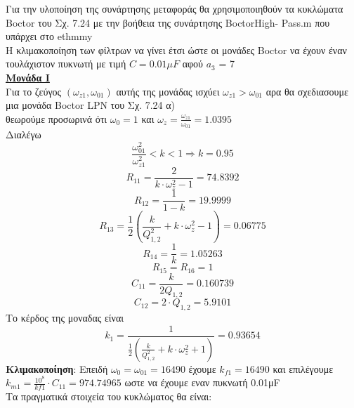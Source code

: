 \documentclass{article}
\begin{document}
{ 
Για την υλοποίηση της συνάρτησης μεταφοράς θα χρησιμοποιηθούν
τα κυκλώματα Boctor του Σχ. 7.24 με την βοήθεια της συνάρτησης  BoctorHigh-
Pass.m που υπάρχει στο ethmmy\\ 
Η κλιμακοποίηση των φίλτρων να γίνει έτσι ώστε οι μονάδες
Boctor
να έχουν έναν τουλάχιστον πυκνωτή με τιμή $\boxed{C = 0.01μF}$ αφού $a_3$ = 7
\\[0.4\baselineskip]
\large{ \underline{\textbf{Μονάδα Ι}} \\[0.4\baselineskip]}
\large{}
Για το ζεύγος $(ω_{z1},ω_{01})$ αυτής της μονάδας ισχύει $\boxed{ω_{z1}>ω_{01}}$ αρα θα σχεδιασουμε μια μονάδα Boctor LPN του Σχ. 7.24 α) \\
θεωρούμε προσωρινά ότι $ω_0=1$ και $ω_z = \frac{ω_{z1}}{ω_{01}} = 1.0395$ \\
Διαλέγω 
\begin{equation*}
\frac{ω_{01}^2}{ω_{z1}^2}<k<1 \Rightarrow \boxed{k=0.95}
\end{equation*}
\begin{equation*}
R_{11} = \frac{2}{k \cdot ω_z^2 -1} = 74.8392
\end{equation*}
\begin{equation*}
R_{12} = \frac{1}{1-k} = 19.9999
\end{equation*}
\begin{equation*}
R_{13} =\frac{1}{2}( \frac{k}{Q_{1,2}^2} + k \cdot ω_z^2 -1) = 0.06775
\end{equation*}
\begin{equation*}
R_{14} =\frac{1}{k} =  1.05263
\end{equation*}
\begin{equation*}
R_{15}= R_{16} = 1
\end{equation*}
\begin{equation*}
C_{11} =\frac{k}{2Q_{1,2}} =  0.160739
\end{equation*}
\begin{equation*}
C_{12} =2 \cdot Q_{1,2} = 5.9101
\end{equation*}
Το κέρδος της μοναδας είναι 
\begin{equation*}
k_{1} = \frac{1}{\frac{1}{2}( \frac{k}{Q_{1,2}^2} + k \cdot ω_z^2 +1)} = 0.93654
\end{equation*}
\textbf{Κλιμακοποίηση}: Eπειδή $ω_0 = ω_{01} = 16490$ έχουμε $k_{f1} = 16490$ και επιλέγουμε $k_{m1} = \frac{10^8}{kf1} \cdot C_{11} =  974.74965$ ωστε να έχουμε εναν πυκνωτή 0.01μF 
\\Τα πραγματικά στοιχεία του κυκλώματος θα είναι:
}
\end{document}
